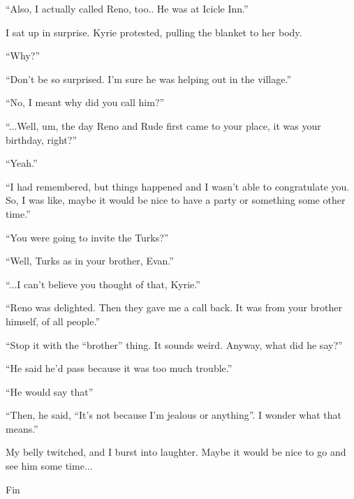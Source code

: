 \documentclass[oneside]{book}
\begin{document}
“Also, I actually called Reno, too.. He was at Icicle Inn.”

I sat up in surprise. Kyrie protested, pulling the blanket to her body.

“Why?”

“Don’t be so surprised. I’m sure he was helping out in the village.”

“No, I meant why did you call him?”

“...Well, um, the day Reno and Rude first came to your place, it was your birthday, right?”

“Yeah.”

“I had remembered, but things happened and I wasn’t able to congratulate you. So, I was like, maybe it would be nice to have a party or something some other time.”

“You were going to invite the Turks?”

“Well, Turks as in your brother, Evan.”

“...I can’t believe you thought of that, Kyrie.”

“Reno was delighted. Then they gave me a call back. It was from your brother himself, of all people.”

“Stop it with the “brother” thing. It sounds weird. Anyway, what did he say?”

“He said he’d pass because it was too much trouble.”

“He would say that”

“Then, he said, “It’s not because I’m jealous or anything”. I wonder what that means.”

My belly twitched, and I burst into laughter. Maybe it would be nice to go and see him some time...

Fin
\end{document}

